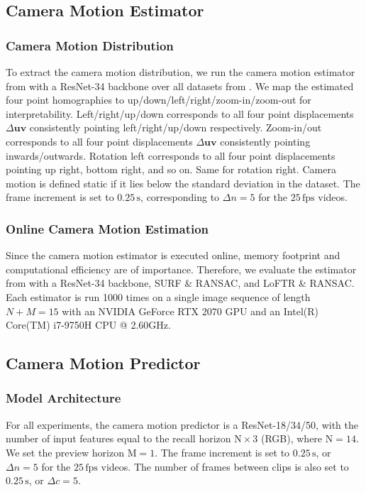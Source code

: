 \subsection{Camera Motion Estimator}
\label{c3:sec:camera_motion_estimator}
\subsubsection{Camera Motion Distribution} 
To extract the camera motion distribution, we run the camera motion estimator from \cite{huber2022deep} with a ResNet-34 backbone over all datasets from . We map the estimated four point homographies to up/down/left/right/zoom-in/zoom-out for interpretability. Left/right/up/down corresponds to all four point displacements $\Delta\mathbf{uv}$ consistently pointing left/right/{\allowbreak}up/down respectively.
Zoom-in/out corresponds to all four point displacements $\Delta\mathbf{uv}$ consistently pointing inwards/outwards. Rotation left corresponds to all four point displacements pointing up right, bottom right, and so on. Same for rotation right. Camera motion is defined static if it lies below the standard deviation in the dataset. The frame increment is set to $0.25\,\text{s}$, corresponding to $\Delta n = 5$ for the $25\,\text{fps}$ videos.

\subsubsection{Online Camera Motion Estimation}
\label{c3:sec:online_camera_motion_estimation}
Since the camera motion estimator is executed online, memory footprint and computational efficiency are of importance. Therefore, we evaluate the estimator from \cite{huber2022deep} with a ResNet-34 backbone, SURF \& RANSAC, and LoFTR \cite{sun2021loftr} \& RANSAC. Each estimator is run 1000 times on a single image sequence of length $N+M=15$ with an NVIDIA GeForce RTX 2070 GPU and an Intel(R) Core(TM) i7-9750H CPU @ 2.60GHz.

\subsection{Camera Motion Predictor}
\label{c3:sec:camera_motion_predictor_experiments}
\subsubsection{Model Architecture}
For all experiments, the camera motion predictor is a ResNet-18/34/50, with the number of input features equal to the recall horizon $\text{N}\times3$ (RGB), where $\text{N}=14$. We set the preview horizon $\text{M}=1$. The frame increment is set to $0.25\,\text{s}$, or $\Delta n = 5$ for the $25\,\text{fps}$ videos. The number of frames between clips is also set to $0.25\,\text{s}$, or $\Delta c = 5$.

